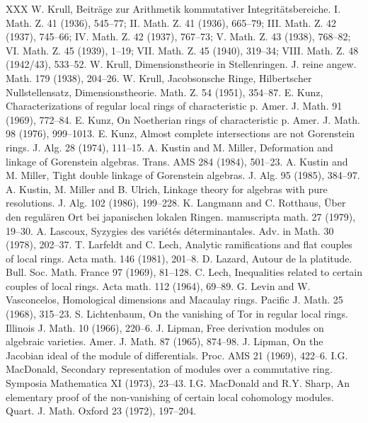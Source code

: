 \begin{thebibliography}{XXX}
 W. Krull, Beitr\"age zur Arithmetik kommutativer Integrit\"atsbereiche. I. Math. Z. 41 (1936), 545--77; II. Math. Z. 41 (1936), 665--79; III. Math. Z. 42 (1937), 745--66; IV. Math. Z. 42 (1937), 767--73; V. Math. Z. 43 (1938), 768--82; VI. Math. Z. 45 (1939), 1--19; VII. Math. Z. 45 (1940), 319--34; VIII. Math. Z. 48 (1942/43), 533--52.
 W. Krull, Dimensionstheorie in Stellenringen. J. reine angew. Math. 179 (1938), 204--26.
 W. Krull, Jacobsonsche Ringe, Hilbertscher Nullstellensatz, Dimensionstheorie. Math. Z. 54 (1951), 354--87.
 E. Kunz, Characterizations of regular local rings of characteristic p. Amer. J. Math. 91 (1969), 772--84.
 E. Kunz, On Noetherian rings of characteristic p. Amer. J. Math. 98 (1976), 999--1013.
 E. Kunz, Almost complete intersections are not Gorenstein rings. J. Alg. 28 (1974), 111--15.
 A. Kustin and M. Miller, Deformation and linkage of Gorenstein algebras. Trans. AMS 284 (1984), 501--23.
 A. Kustin and M. Miller, Tight double linkage of Gorenstein algebras. J. Alg. 95 (1985), 384--97.
 A. Kustin, M. Miller and B. Ulrich, Linkage theory for algebras with pure resolutions. J. Alg. 102 (1986), 199--228.
 K. Langmann and C. Rotthaus, \"Uber den regul\"aren Ort bei japanischen lokalen Ringen. manuscripta math. 27 (1979), 19--30.
 A. Lascoux, Syzygies des vari\'et\'es d\'eterminantales. Adv. in Math. 30 (1978), 202--37.
 T. Larfeldt and C. Lech, Analytic ramifications and flat couples of local rings. Acta math. 146 (1981), 201--8.
 D. Lazard, Autour de la platitude. Bull. Soc. Math. France 97 (1969), 81--128.
 C. Lech, Inequalities related to certain couples of local rings. Acta math. 112 (1964), 69--89.
 G. Levin and W. Vasconcelos, Homological dimensions and Macaulay rings. Pacific J. Math. 25 (1968), 315--23.
 S. Lichtenbaum, On the vanishing of Tor in regular local rings. Illinois J. Math. 10 (1966), 220--6.
 J. Lipman, Free derivation modules on algebraic varieties. Amer. J. Math. 87 (1965), 874--98.
 J. Lipman, On the Jacobian ideal of the module of differentials. Proc. AMS 21 (1969), 422--6.
 I.G. MacDonald, Secondary representation of modules over a commutative ring. Symposia Mathematica XI (1973), 23--43.
 I.G. MacDonald and R.Y. Sharp, An elementary proof of the non-vanishing of certain local cohomology modules. Quart. J. Math. Oxford 23 (1972), 197--204.

\end{thebibliography}
